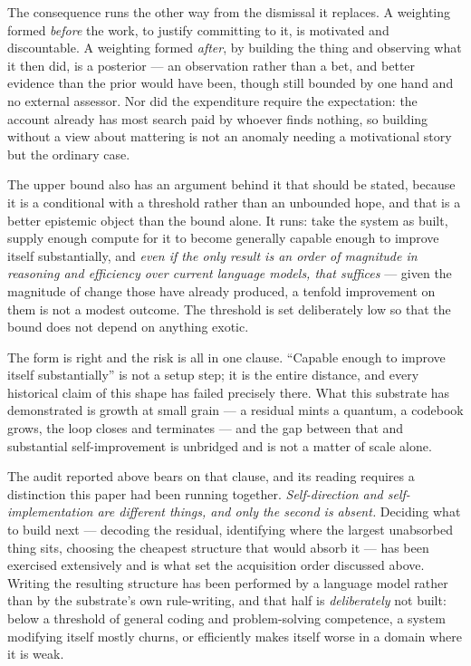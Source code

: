 \documentclass[11pt,a4paper]{article}
\theoremstyle{remark}\newtheorem{remark}[definition]{Remark}
\begin{document}
The consequence runs the other way from the dismissal it replaces. A weighting formed \emph{before} the
work, to justify committing to it, is motivated and discountable. A weighting formed \emph{after},
by building the thing and observing what it then did, is a posterior --- an observation rather than a
bet, and better evidence than the prior would have been, though still bounded by one hand and no
external assessor. Nor did the expenditure require the expectation: the account already has most search
paid by whoever finds nothing, so building without a view about mattering is not an anomaly needing a
motivational story but the ordinary case.

The upper bound also has an argument behind it that should be stated, because it is a conditional with
a threshold rather than an unbounded hope, and that is a better epistemic object than the bound alone.
It runs: take the system as built, supply enough compute for it to become generally capable enough to
improve itself substantially, and \emph{even if the only result is an order of magnitude in reasoning
and efficiency over current language models, that suffices} --- given the magnitude of change those
have already produced, a tenfold improvement on them is not a modest outcome. The threshold is set
deliberately low so that the bound does not depend on anything exotic.

The form is right and the risk is all in one clause. ``Capable enough to improve itself substantially''
is not a setup step; it is the entire distance, and every historical claim of this shape has failed
precisely there. What this substrate has demonstrated is growth at small grain --- a residual mints a
quantum, a codebook grows, the loop closes and terminates --- and the gap between that and substantial
self-improvement is unbridged and is not a matter of scale alone.

The audit reported above bears on that clause, and its reading requires a distinction this paper had
been running together. \emph{Self-direction and self-implementation are different things, and only the
second is absent.} Deciding what to build next --- decoding the residual, identifying where the largest
unabsorbed thing sits, choosing the cheapest structure that would absorb it --- has been exercised
extensively and is what set the acquisition order discussed above. Writing the resulting structure has
been performed by a language model rather than by the substrate's own rule-writing, and that half is
\emph{deliberately} not built: below a threshold of general coding and problem-solving competence, a
system modifying itself mostly churns, or efficiently makes itself worse in a domain where it is weak.
\end{document}
